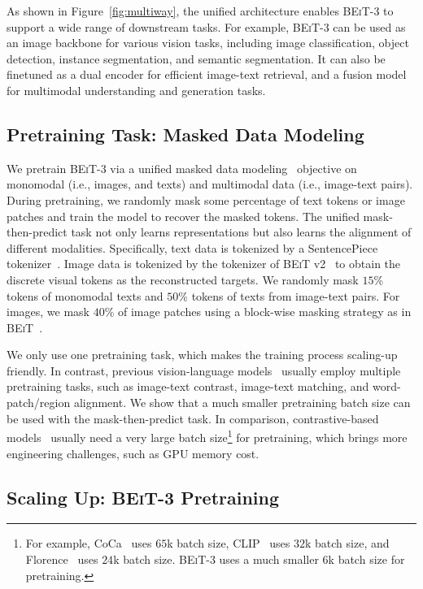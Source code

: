 \documentclass{article}
\newcommand\our{\textsc{BEiT-3}}
\newcommand\beit{\textsc{BEiT}}
\begin{document}
As shown in Figure~\ref{fig:multiway}, the unified architecture enables \our{} to support a wide range of downstream tasks.
For example, \our{} can be used as an image backbone for various vision tasks, including image classification, object detection, instance segmentation, and semantic segmentation.
It can also be finetuned as a dual encoder for efficient image-text retrieval, and a fusion model for multimodal understanding and generation tasks.


\subsection{Pretraining Task: Masked Data Modeling}

We pretrain \our{} via a unified masked data modeling~\citep{vlbeit} objective on monomodal (i.e., images, and texts) and multimodal data (i.e., image-text pairs).
During pretraining, we randomly mask some percentage of text tokens or image patches and train the model to recover the masked tokens.
The unified mask-then-predict task not only learns representations but also learns the alignment of different modalities.
Specifically, text data is tokenized by a SentencePiece tokenizer~\citep{sentencepiece}.
Image data is tokenized by the tokenizer of \beit{} v2~\citep{beitv2} to obtain the discrete visual tokens as the reconstructed targets.
We randomly mask $15$\% tokens of monomodal texts and $50$\% tokens of texts from image-text pairs.
For images, we mask $40$\% of image patches using a block-wise masking strategy as in \beit{}~\citep{beit,beitv2}.

We only use one pretraining task, which makes the training process scaling-up friendly. In contrast, previous vision-language models~\citep{oscar,vinvl,vilt,albef,vlmo,blip,coca} usually employ multiple pretraining tasks, such as image-text contrast, image-text matching, and word-patch/region alignment.
We show that a much smaller pretraining batch size can be used with the mask-then-predict task.
In comparison, contrastive-based models~\cite{clip,align,florence,coca} usually need a very large batch size\footnote{For example, CoCa~\citep{coca} uses $65$k batch size, CLIP~\citep{clip} uses $32$k batch size, and Florence~\citep{florence} uses $24$k batch size. \our{} uses a much smaller $6$k batch size for pretraining.} for pretraining, which brings more engineering challenges, such as GPU memory cost.


\subsection{Scaling Up: \our{} Pretraining}
\end{document}
